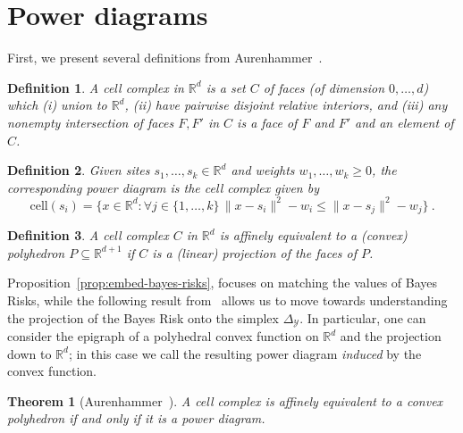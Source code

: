 \documentclass[11pt]{article}
\newcommand{\reals}{\mathbb{R}}
\newcommand{\cell}{\mathrm{cell}}
\newcommand{\simplex}{\Delta_\Y}
\newcommand{\Y}{\mathcal{Y}}
\newtheorem{theorem}{Theorem}
\newtheorem{definition}{Definition}
\begin{document}
\appendix

\newpage
\section{Power diagrams}\label{app:power-diagrams}
First, we present several definitions from Aurenhammer~\cite{aurenhammer1987power}.
\begin{definition}\label{def:cell-complex}
  A \emph{cell complex} in $\reals^d$ is a set $C$ of faces (of dimension $0,\ldots,d$) which (i) union to $\reals^d$, (ii) have pairwise disjoint relative interiors, and (iii) any nonempty intersection of faces $F,F'$ in $C$ is a face of $F$ and $F'$ and an element of $C$.
\end{definition}

\begin{definition}\label{def:power-diagram}
  Given sites $s_1,\ldots,s_k\in\reals^d$ and weights $w_1,\ldots,w_k \geq 0$, the corresponding \emph{power diagram} is the cell complex given by
  \begin{equation}
    \label{eq:pd}
    \cell(s_i) = \{ x \in\reals^d : \forall j \in \{1,\ldots,k\} \, \|x - s_i\|^2 - w_i \leq \|x - s_j\|^2 - w_j\}~.
  \end{equation}
\end{definition}

\begin{definition}\label{def:affine-equiv}
  A cell complex $C$ in $\reals^d$ is \emph{affinely equivalent} to a (convex) polyhedron $P \subseteq \reals^{d+1}$ if $C$ is a (linear) projection of the faces of $P$.
\end{definition}

Proposition~\ref{prop:embed-bayes-risks}, focuses on matching the values of Bayes Risks, while the following result from~\citet{aurenhammer1987power} allows us to move towards understanding the projection of the Bayes Risk onto the simplex $\simplex$.
In particular, one can consider the epigraph of a polyhedral convex function on $\reals^d$ and the projection down to $\reals^d$; in this case we call the resulting power diagram \emph{induced} by the convex function.

\begin{theorem}[Aurenhammer~\cite{aurenhammer1987power}]\label{thm:aurenhammer}
	A cell complex is affinely equivalent to a convex polyhedron if and only if it is a power diagram.
\end{theorem}
\end{document}
